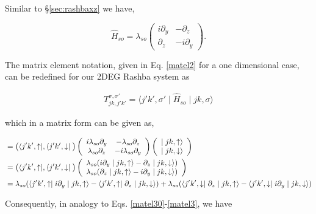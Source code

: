 \documentclass[10pt,prb,showpacs,amssymb,floatfix]{revtex4-1}
\begin{document}
Similar to \S \ref{sec:rashbaxz} we have, 

\begin{equation}
\hat H_{so} =  \lambda_{so} \left(\begin{array}{cc} 
i\partial_y & -\partial_z\\
\partial_z  & - i\partial_y
\end{array}\right).
\label{eq11yz}
\end{equation}

The matrix element notation, given in Eq. \eqref{matel2} for a one dimensional case, can be redefined for our 2DEG Rashba system as 

\begin{align}
T_{jk,j'k'}^{\sigma,\sigma'} = \langle j'k',\sigma' \mid \hat{H}_{so} \mid jk, \sigma \rangle
\end{align}

which in a matrix form can be given as,

\begin{align}
&=  \big{(} \langle j'k',\uparrow \mid , \langle j'k',\downarrow \mid \big{)} \left(\begin{array}{cc} 
i\lambda_{so}\partial_y &  -\lambda_{so} \partial_z\\
 \lambda_{so}\partial_z  & - i\lambda_{so} \partial_y
\end{array}\right)  \left(\begin{array}{c} 
\mid jk,\uparrow \rangle \\
\mid jk,\downarrow \rangle
\end{array}\right) \\
&= \big{(}\langle j'k',\uparrow \mid , \langle j'k',\downarrow \mid \big{)}  \left(\begin{array}{c} 
\lambda_{so}(i\partial_y\mid jk,\uparrow\rangle   - \partial_z \mid jk,\downarrow \rangle) \\
\lambda_{so}(\partial_z \mid jk,\uparrow \rangle   - i \partial_y \mid jk,\downarrow \rangle)
\end{array}\right) \\
&= \lambda_{so}(\langle j'k',\uparrow \mid i\partial_y\mid jk,\uparrow\rangle   - \langle j'k',\uparrow \mid \partial_z \mid jk,\downarrow \rangle) +  \lambda_{so}(  \langle j'k',\downarrow \mid \partial_z \mid jk,\uparrow\rangle   -  \langle j'k',\downarrow \mid i \partial_y \mid jk,\downarrow \rangle)
\label{eq12yz}
\end{align}

Consequently, in analogy to Eqs. \eqref{matel30}-\eqref{matel3}, we have
 
\end{document}
